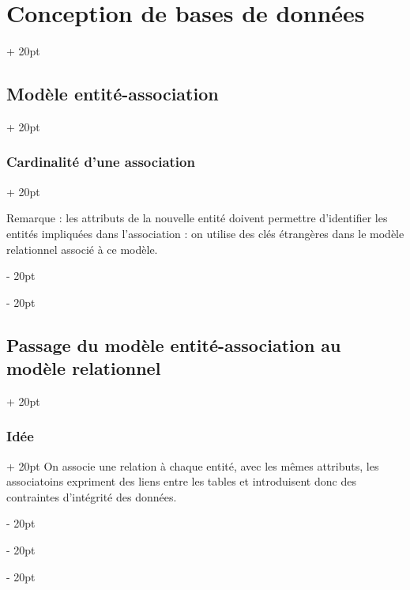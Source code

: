 \documentclass[a4paper, 12pt, twoside]{article}
\newcommand{\ind}[1][20pt]{\advance\leftskip + #1}
\newcommand{\deind}[1][20pt]{\advance\leftskip - #1}
\newenvironment{indt}[2][20pt]{#2 \par \ind[#1]}{\par \deind} %
\begin{document}
\begin{indt}{\section{Conception de bases de données}}
\begin{indt}{\subsection{Modèle entité-association}}
\begin{indt}{\subsubsection{Cardinalité d'une association}}
                \begin{center}
                \end{center}

                Remarque : les attributs de la nouvelle entité doivent permettre d'identifier les entités impliquées dans l'association : on utilise des clés étrangères dans le modèle relationnel associé à ce modèle.
            \end{indt}
        \end{indt}

        \vspace{12pt}
        
        \begin{indt}{\subsection{Passage du modèle entité-association au modèle relationnel}}
            \begin{indt}{\subsubsection{Idée}}
                On associe une relation à chaque  entité, avec les mêmes attributs, les associatoins expriment des liens entre les tables et introduisent donc des contraintes d'intégrité des données.


\end{indt}
\end{indt}
\end{indt}
\end{document}
